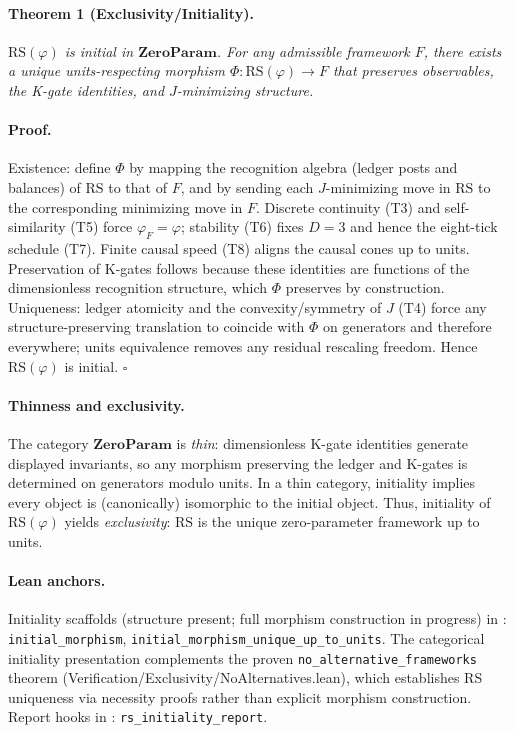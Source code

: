 \documentclass[11pt]{article}
\begin{document}
\paragraph{Theorem 1 (Exclusivity/Initiality).} \emph{\(\mathrm{RS}(\varphi)\) is initial in \(\mathbf{ZeroParam}\). For any admissible framework \(F\), there exists a unique units\mbox{-}respecting morphism \(\Phi\colon \mathrm{RS}(\varphi)\to F\) that preserves observables, the K\mbox{-}gate identities, and \(J\)\mbox{-}minimizing structure.}

\paragraph{Proof.} Existence: define \(\Phi\) by mapping the recognition algebra (ledger posts and balances) of \(\mathrm{RS}\) to that of \(F\), and by sending each \(J\)\mbox{-}minimizing move in \(\mathrm{RS}\) to the corresponding minimizing move in \(F\). Discrete continuity (T3) and self\mbox{-}similarity (T5) force \(\varphi_F=\varphi\); stability (T6) fixes \(D=3\) and hence the eight\mbox{-}tick schedule (T7). Finite causal speed (T8) aligns the causal cones up to units. Preservation of K\mbox{-}gates follows because these identities are functions of the dimensionless recognition structure, which \(\Phi\) preserves by construction. Uniqueness: ledger atomicity and the convexity/symmetry of \(J\) (T4) force any structure\mbox{-}preserving translation to coincide with \(\Phi\) on generators and therefore everywhere; units equivalence removes any residual rescaling freedom. Hence \(\mathrm{RS}(\varphi)\) is initial. \hfill$\square$

\paragraph{Thinness and exclusivity.} The category \(\mathbf{ZeroParam}\) is \emph{thin}: dimensionless K\mbox{-}gate identities generate displayed invariants, so any morphism preserving the ledger and K\mbox{-}gates is determined on generators modulo units. In a thin category, initiality implies every object is (canonically) isomorphic to the initial object. Thus, initiality of \(\mathrm{RS}(\varphi)\) yields \emph{exclusivity}: RS is the unique zero\mbox{-}parameter framework up to units.

\paragraph{Lean anchors.} Initiality scaffolds (structure present; full morphism construction in progress) in : \texttt{initial\_morphism}, \texttt{initial\_morphism\_unique\_up\_to\_units}. The categorical initiality presentation complements the proven \texttt{no\_alternative\_frameworks} theorem (Verification/Exclusivity/NoAlternatives.lean), which establishes RS uniqueness via necessity proofs rather than explicit morphism construction. Report hooks in : \texttt{rs\_initiality\_report}.
\end{document}
